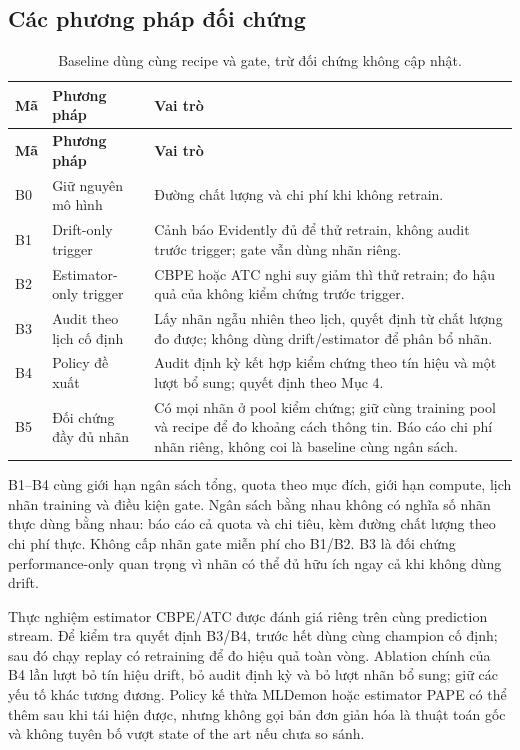\subsection{Các phương pháp đối chứng}
\begin{xltabular}{\linewidth}{@{}L{0.7cm} L{3.2cm} Y@{}}
\caption{Baseline dùng cùng recipe và gate, trừ đối chứng không cập nhật.}\label{tab:baselines}\\
\toprule\textbf{Mã} & \textbf{Phương pháp} & \textbf{Vai trò} \\
\midrule\endfirsthead
\toprule\textbf{Mã} & \textbf{Phương pháp} & \textbf{Vai trò} \\
\midrule\endhead
B0 & Giữ nguyên mô hình & Đường chất lượng và chi phí khi không retrain. \\
B1 & Drift-only trigger & Cảnh báo Evidently đủ để thử retrain, không audit trước trigger; gate vẫn dùng nhãn riêng. \\
B2 & Estimator-only trigger & CBPE hoặc ATC nghi suy giảm thì thử retrain; đo hậu quả của không kiểm chứng trước trigger. \\
B3 & Audit theo lịch cố định & Lấy nhãn ngẫu nhiên theo lịch, quyết định từ chất lượng đo được; không dùng drift/estimator để phân bổ nhãn. \\
B4 & Policy đề xuất & Audit định kỳ kết hợp kiểm chứng theo tín hiệu và một lượt bổ sung; quyết định theo Mục 4. \\
B5 & Đối chứng đầy đủ nhãn & Có mọi nhãn ở pool kiểm chứng; giữ cùng training pool và recipe để đo khoảng cách thông tin. Báo cáo chi phí nhãn riêng, không coi là baseline cùng ngân sách. \\
\bottomrule
\end{xltabular}
B1--B4 cùng giới hạn ngân sách tổng, quota theo mục đích, giới hạn compute, lịch nhãn training và điều kiện gate. Ngân sách bằng nhau không có nghĩa số nhãn thực dùng bằng nhau: báo cáo cả quota và chi tiêu, kèm đường chất lượng theo chi phí thực. Không cấp nhãn gate miễn phí cho B1/B2. B3 là đối chứng performance-only quan trọng vì nhãn có thể đủ hữu ích ngay cả khi không dùng drift.

Thực nghiệm estimator CBPE/ATC được đánh giá riêng trên cùng prediction stream. Để kiểm tra quyết định B3/B4, trước hết dùng cùng champion cố định; sau đó chạy replay có retraining để đo hiệu quả toàn vòng. Ablation chính của B4 lần lượt bỏ tín hiệu drift, bỏ audit định kỳ và bỏ lượt nhãn bổ sung; giữ các yếu tố khác tương đương. Policy kế thừa MLDemon hoặc estimator PAPE có thể thêm sau khi tái hiện được, nhưng không gọi bản đơn giản hóa là thuật toán gốc và không tuyên bố vượt state of the art nếu chưa so sánh.

